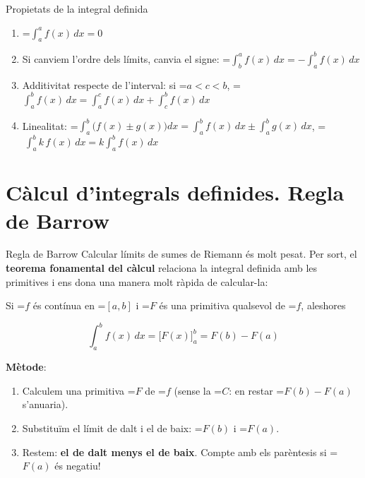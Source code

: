 \documentclass[11pt,a4paper]{article}
\newcommand{\lt}{<}\newcommand{\gt}{>}
\newcommand{\fmm}[1]{\setbox0=\hbox{$#1$}\ifdim\wd0>\linewidth\[#1\]\else\mbox{\box0}\fi}
\newcommand{\fmuline}[1]{\textbf{\color{fmaccent}#1}}
\begin{document}
  
\begin{fmprop}{Propietats de la integral definida}
\begin{enumerate}
\item \fmm{\displaystyle\int_a^a f(x)\,dx=0}
\item Si canviem l'ordre dels límits, canvia el signe: \fmm{\displaystyle\int_b^a f(x)\,dx=-\int_a^b f(x)\,dx}
\item Additivitat respecte de l'interval: si \fmm{a\lt c\lt b}, \fmm{\displaystyle\int_a^b f(x)\,dx=\int_a^c f(x)\,dx+\int_c^b f(x)\,dx}
\item Linealitat: \fmm{\displaystyle\int_a^b\big(f(x)\pm g(x)\big)dx=\int_a^b f(x)\,dx\pm\int_a^b g(x)\,dx}, \fmm{\ \displaystyle\int_a^b k\,f(x)\,dx=k\int_a^b f(x)\,dx}
\end{enumerate}
\end{fmprop}

  
\section{Càlcul d'integrals definides. Regla de Barrow}\hypertarget{sec5}{}

  

  
\begin{fmdef}{Regla de Barrow}
Calcular límits de sumes de Riemann és molt pesat. Per sort, el \textbf{teorema fonamental del càlcul} relaciona la integral definida amb les primitives i ens dona una manera molt ràpida de calcular-la:

      

Si \fmm{f} és contínua en \fmm{[a,b]} i \fmm{F} és una primitiva qualsevol de \fmm{f}, aleshores

      
\[\int_a^b f(x)\,dx=\Big[F(x)\Big]_a^b=F(b)-F(a)\]

      

\fmuline{Mètode}:

      
\begin{enumerate}
\item Calculem una primitiva \fmm{F} de \fmm{f} (sense la \fmm{C}: en restar \fmm{F(b)-F(a)} s'anu\lgem{}aria).
\item Substituïm el límit de dalt i el de baix: \fmm{F(b)} i \fmm{F(a)}.
\item Restem: \textbf{el de dalt menys el de baix}. Compte amb els parèntesis si \fmm{F(a)} és negatiu!
\end{enumerate}
\end{fmdef}
\end{document}
